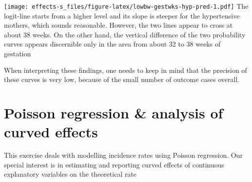 \documentclass[
]{book}
\newenvironment{Shaded}{\begin{snugshade}}{\end{snugshade}}
\newcommand{\AttributeTok}[1]{\textcolor[rgb]{0.13,0.29,0.53}{#1}}
\newcommand{\DecValTok}[1]{\textcolor[rgb]{0.00,0.00,0.81}{#1}}
\newcommand{\FunctionTok}[1]{\textcolor[rgb]{0.13,0.29,0.53}{\textbf{#1}}}
\newcommand{\NormalTok}[1]{#1}
\newcommand{\OtherTok}[1]{\textcolor[rgb]{0.56,0.35,0.01}{#1}}
\newcommand{\SpecialCharTok}[1]{\textcolor[rgb]{0.81,0.36,0.00}{\textbf{#1}}}
\newcommand{\StringTok}[1]{\textcolor[rgb]{0.31,0.60,0.02}{#1}}
\begin{document}
\begin{Shaded}
\end{Shaded}

\texttt{[image: effects-s\_files/figure-latex/lowbw-gestwks-hyp-pred-1.pdf]}
The logit-line starts from a higher level and its slope is steeper
for the hypertensive mothers, which sounds reasonable.
However, the two lines
appear to cross at about 38 weeks. On the other hand, the vertical difference
of the two probability curves appears discernible only in the area
from about 32 to 38 weeks of gestation

When interpreting these findings, one needs to keep in mind that
the precision of these curves is very low, because of
the small number of outcome cases overall.

\chapter{Poisson regression \& analysis of curved effects}\label{poisson-regression-analysis-of-curved-effects}

This exercise deals with modelling incidence rates
using Poisson regression. Our special interest is in
estimating and reporting curved effects of continuous
explanatory variables on the theoretical rate
\end{document}
